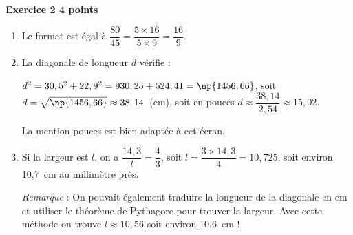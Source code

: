 \textbf{Exercice 2 \hfill 4 points}

\bigskip

%
 
\begin{enumerate}
\item %
 
Le format est égal à  $\dfrac{80}{45} = \dfrac{5\times 16}{5\times 9} = \dfrac{16}{9}$. 
\item %

La diagonale de longueur $d$ vérifie :

$d^2 = 30,5^2 + 22,9^2 = 930,25 + 524,41 = \np{1456,66}$, soit $d = \sqrt{\np{1456,66}} \approx 38,14$~(cm), soit en pouces $d \approx \dfrac{38,14}{2,54} \approx 15,02$.

La mention  pouces \fg{} est bien adaptée à  cet écran. 
\item %
Si la largeur est $l$, on a $\dfrac{14,3}{l} = \dfrac{4}{3}$, soit $l = \dfrac{3 \times 14,3}{4} = 10,725$, soit environ 10,7~cm au millimètre près.

\emph{Remarque} :  On pouvait également traduire la longueur de la diagonale en cm et utiliser le théorème de Pythagore pour trouver la largeur. Avec cette méthode on trouve $l \approx 10,56$ soit environ 10,6~cm !
\end{enumerate}
 
\bigskip
 
